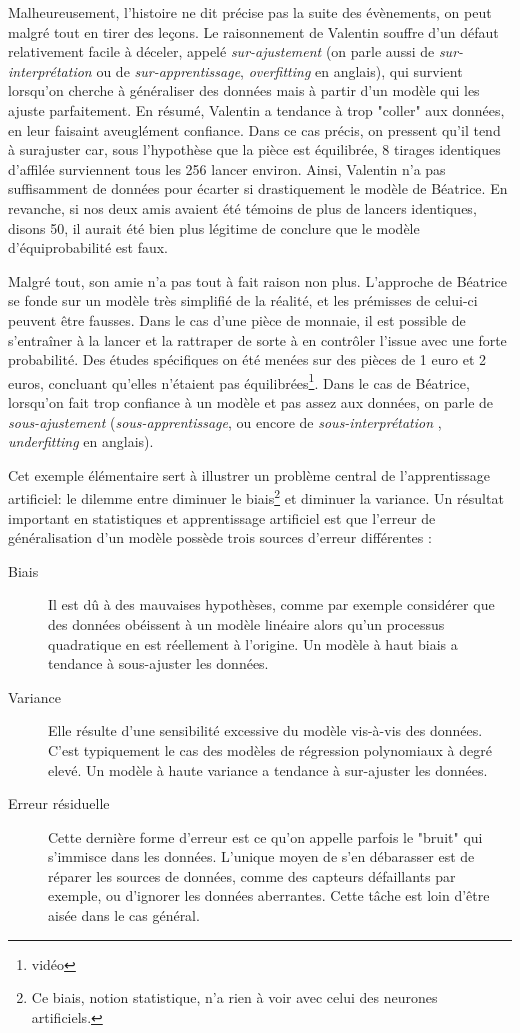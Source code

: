 Malheureusement, l'histoire ne dit précise pas la suite des évènements, on peut malgré tout en tirer des leçons. Le raisonnement de Valentin souffre d'un défaut relativement facile à déceler, appelé \emph{sur-ajustement} (on parle aussi de \emph{sur-interprétation} ou de \emph{sur-apprentissage}, \emph{overfitting} en anglais), qui survient lorsqu'on cherche à généraliser des données mais à partir d'un modèle qui les ajuste parfaitement. En résumé, Valentin a tendance à trop "coller" aux données, en leur faisaint aveuglément confiance. Dans ce cas précis, on pressent qu'il tend à surajuster car, sous l'hypothèse que la pièce est équilibrée, 8 tirages identiques d'affilée surviennent tous les 256 lancer environ. Ainsi, Valentin n'a pas suffisamment de données pour écarter si drastiquement le modèle de Béatrice. En revanche, si nos deux amis avaient été témoins de plus de lancers identiques, disons 50, il aurait été bien plus légitime de conclure que le modèle d'équiprobabilité est faux.

Malgré tout, son amie n'a pas tout à fait raison non plus. L'approche de Béatrice se fonde sur un modèle très simplifié de la réalité, et les prémisses de celui-ci peuvent être fausses. Dans le cas d'une pièce de monnaie, il est possible de s'entraîner à la lancer et la rattraper de sorte à en contrôler l'issue avec une forte probabilité. Des études spécifiques on été menées sur des pièces de 1 euro et 2 euros, concluant qu'elles n'étaient pas équilibrées\footnote{vidéo}. Dans le cas de Béatrice, lorsqu'on fait trop confiance à un modèle et pas assez aux données, on parle de \emph{sous-ajustement} (\emph{sous-apprentissage}, ou encore de \emph{sous-interprétation} , \emph{underfitting} en anglais).

Cet exemple élémentaire sert à illustrer un problème central de l'apprentissage artificiel: le dilemme entre diminuer le biais\footnote{Ce biais, notion statistique, n'a rien à voir avec celui des neurones artificiels.} et diminuer la variance. Un résultat important en statistiques et apprentissage artificiel est que l'erreur de généralisation d'un modèle  possède trois sources d'erreur différentes : 
\begin{description}
\item [Biais] Il est dû à des mauvaises hypothèses, comme par exemple considérer que des données obéissent à un modèle linéaire alors qu'un processus quadratique en est réellement à l'origine. Un modèle à haut biais a tendance à sous-ajuster les données.
\item [Variance] Elle résulte d'une sensibilité excessive du modèle vis-à-vis des données. C'est typiquement le cas des modèles de régression polynomiaux à degré elevé. Un modèle à haute variance a tendance à sur-ajuster les données.
\item[Erreur résiduelle] Cette dernière forme d'erreur est ce qu'on appelle parfois le "bruit" qui s'immisce dans les données. L'unique moyen de s'en débarasser est de réparer les sources de données, comme des capteurs défaillants par exemple, ou d'ignorer les données aberrantes. Cette tâche est loin d'être aisée dans le cas général.
\end{description}

